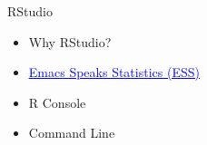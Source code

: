 \documentclass{beamer}
\begin{document}
\begin{frame}{
	\begin{minipage}[t]{0.75\textwidth}
		RStudio
	\end{minipage}
	\hfill
	\begin{minipage}[t]{0.25\textwidth}
		\flushright
	\end{minipage}
}{}
	\begin{itemize}
		\item Why RStudio? 
		\item \href{https://ess.r-project.org/index.php?Section=home}{\textcolor{blue}{\underline{Emacs Speaks Statistics (ESS)}}}
		\item R Console
		\item Command Line
	\end{itemize}
\end{frame}
\end{document}
